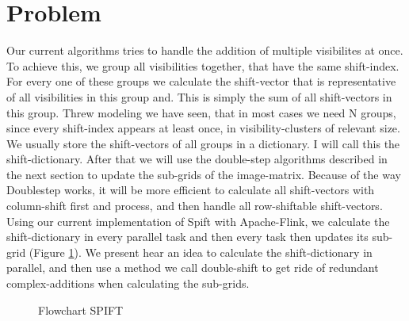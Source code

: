 \documentclass[12pt]{article}
\begin{document}
\maketitle

\section{Problem}
Our current algorithms tries to handle the addition of multiple visibilites at once. To achieve this, we group all visibilities together, that have the same shift-index. For every one of these groups we calculate the shift-vector that is representative of all visibilities in this group and. This is simply the sum of all shift-vectors in this group.
Threw modeling we have seen, that in most cases we need N groups, since every shift-index appears at least once, in visibility-clusters of relevant size. We usually store the shift-vectors of all groups in a dictionary. I will call this the shift-dictionary. After that we will use the double-step algorithms described in the next section to update the sub-grids of the image-matrix. Because of the way Doublestep works, it will be more efficient to calculate all shift-vectors with column-shift first and process, and then handle all row-shiftable shift-vectors. \\

Using our current implementation of Spift with Apache-Flink, we calculate the shift-dictionary in every parallel task and then every task then updates its sub-grid (Figure \ref{fig:floatSPIFT}). We present hear an idea to calculate the shift-dictionary in parallel, and then use a method we call double-shift to get ride of redundant complex-additions when calculating the sub-grids. \\

\begin{figure}

\caption{Flowchart SPIFT}
\label{fig:floatSPIFT}
\end{figure}
\end{document}

